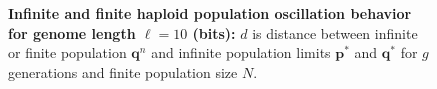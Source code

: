 \begin{figure}[H]
\begin{center}
\end{center}
\begin{center}
\hspace{5pt}
\hspace{5pt}


\caption{\textbf{Infinite and finite haploid population oscillation behavior for genome length $\ell = 10$ (bits):} $d$ is
  distance between infinite or finite population ${\bm q}^n$ and infinite
  population limits ${{\bm p}^\ast}$ and ${{\bm q}^{\ast}}$ for $g$ generations and finite population size $N$.}
\label{oscillation_10h}
\end{center}
\end{figure}


